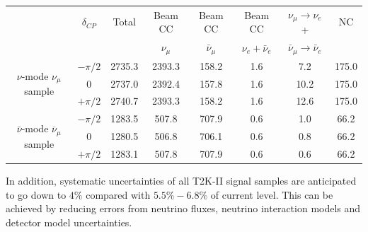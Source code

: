 \documentclass[a4 paper,12pt]{report}%
\begin{document}
\vspace{0.5cm}
\begin{center} 
\label{tab:t2knumu}
\begin{tabular}{|c| c| c| c| c| c| c| c|}
\hline
  & $\delta_{CP}$& Total & Beam CC  &  Beam CC   & Beam CC & $\nu_\mu \rightarrow \nu_e$ +&   NC \\ 
  &    &    & $\nu_\mu $ &   $ \bar{\nu}_\mu$ &  $\nu_e + \bar{\nu}_e$ & $\bar{\nu}_\mu \rightarrow \bar{\nu}_e$ &  \\
  \hline  
  
  \multirow{3}{*}{ $\nu$-mode $\nu_{\mu}$ sample}& $-\pi/2$ &  2735.3 & 2393.3 & 158.2 & 1.6 & 7.2 & 175.0  \\

 & 	0	 & 2737.0	 &  2392.4	& 157.8		& 1.6 & 10.2 & 175.0\\ 
 
 & $+\pi/2$ & 2740.7	 &  2393.3	& 158.2		& 1.6 & 12.6 & 175.0\\ 
 \hline

  \multirow{3}{*}{ $\bar{\nu}$-mode $\overline{\nu}_{\mu}$ sample}& $-\pi/2$ &  1283.5 & 507.8 & 707.9 & 0.6 & 1.0 & 66.2  \\

 & 	0	 & 1280.5	 & 506.8 	& 706.1		& 0.6 & 0.8 & 66.2\\ 
 
 & $+\pi/2$ & 1283.1	 & 507.8	& 707.9		& 0.6 & 0.6 & 66.2\\ 
 \hline

\end{tabular} 
\end{center}

\noindent  In addition, systematic uncertainties of all T2K-II signal samples are anticipated to go down to $4\%$ compared with $5.5\% - 6.8\%$ of current level. This can be achieved by reducing errors from neutrino fluxes, neutrino interaction models and detector model uncertainties. 

\end{document}
